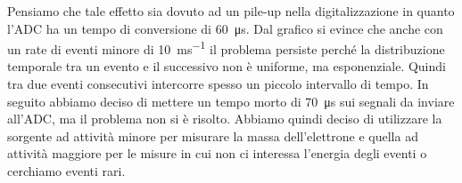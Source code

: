 Pensiamo che tale effetto sia dovuto ad un pile-up nella digitalizzazione in quanto l'ADC ha un tempo di conversione di \SI{60}{\micro s}.
Dal grafico si evince che anche con un rate di eventi minore di \SI{10}{ms^{-1}} il problema persiste perché la distribuzione temporale tra un evento e il successivo non è uniforme, ma esponenziale. Quindi tra due eventi consecutivi intercorre spesso un piccolo intervallo di tempo.
In seguito abbiamo deciso di mettere un tempo morto di \SI{70}{\micro s} sui segnali da inviare all'ADC, ma il problema non si è risolto.
Abbiamo quindi deciso di utilizzare la sorgente ad attività minore per misurare la massa dell'elettrone e quella ad attività maggiore per le misure in cui non ci interessa l'energia degli eventi o cerchiamo eventi rari.